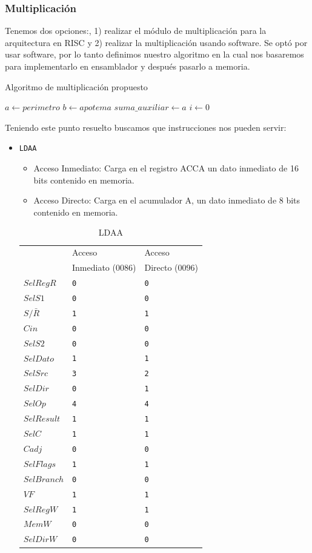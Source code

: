 \documentclass{IEEEtran}
\begin{document}
\subsubsection{Multiplicación}
\label{sec:org582ed25}
Tenemos dos opciones:, 1) realizar el módulo de multiplicación para la arquitectura en RISC y 2) realizar la multiplicación usando software. Se optó por usar software, por lo tanto definimos nuestro algoritmo en la cual nos basaremos para implementarlo en ensamblador y después pasarlo a memoria.
\begin{algorithm}
\caption{Algoritmo de multiplicación propuesto}
$a \gets perimetro$\;
$b \gets apotema$\;
$suma\_auxiliar \gets a$\;
$i \gets 0$\;
\end{algorithm}
Teniendo este punto resuelto buscamos que instrucciones nos pueden servir\cite[pp. 24-26]{PM1999}:
\begin{itemize}
\item \texttt{LDAA}
\begin{itemize}
\item Acceso Inmediato: Carga en el registro ACCA un dato inmediato de 16 bits contenido en memoria.
\item Acceso Directo: Carga en el acumulador A, un dato inmediato de 8 bits contenido en memoria.
\end{itemize}
\begin{table}[htbp]
\caption{LDAA}
\centering
\begin{tabular}{lll}
\hline
 & Acceso & Acceso\\
 & Inmediato (\(0086\)) & Directo (\(0096\))\\
\hline
\(SelRegR\) & \texttt{0} & \texttt{0}\\
\(SelS1\) & \texttt{0} & \texttt{0}\\
\(S/\bar{R}\) & \texttt{1} & \texttt{1}\\
\(Cin\) & \texttt{0} & \texttt{0}\\
\(SelS2\) & \texttt{0} & \texttt{0}\\
\(SelDato\) & \texttt{1} & \texttt{1}\\
\(SelSrc\) & \texttt{3} & \texttt{2}\\
\(SelDir\) & \texttt{0} & \texttt{1}\\
\(SelOp\) & \texttt{4} & \texttt{4}\\
\(SelResult\) & \texttt{1} & \texttt{1}\\
\(SelC\) & \texttt{1} & \texttt{1}\\
\(Cadj\) & \texttt{0} & \texttt{0}\\
\(SelFlags\) & \texttt{1} & \texttt{1}\\
\(SelBranch\) & \texttt{0} & \texttt{0}\\
\(VF\) & \texttt{1} & \texttt{1}\\
\(SelRegW\) & \texttt{1} & \texttt{1}\\
\(MemW\) & \texttt{0} & \texttt{0}\\
\(SelDirW\) & \texttt{0} & \texttt{0}\\
\hline
\end{tabular}
\end{table}
\end{itemize}
\end{document}
